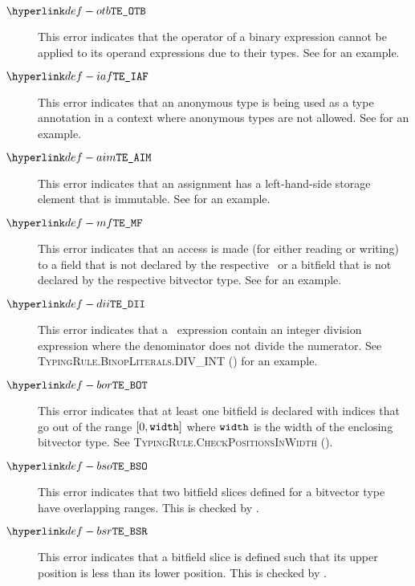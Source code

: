 \begin{description}
\hypertarget{def-otb}{}
\item[$\InvalidOperandTypesForBinop$]
This error indicates that the operator of a binary expression cannot be applied to its operand expressions
due to their types.
See  for an example.

\hypertarget{def-iaf}{}
\item[$\AnnonymousFormNotAllowedHere$]
This error indicates that an anonymous type is being used as a type annotation in a context
where anonymous types are not allowed.
See  for an example.

\hypertarget{def-aim}{}
\item[$\AssignmentToImmutable$]
This error indicates that an assignment has a left-hand-side storage element that is immutable.
See  for an example.

\hypertarget{def-mf}{}
\item[$\MissingField$]
This error indicates that an access is made (for either reading or writing) to a field that is
not declared by the respective \structuredtype\ or a bitfield that is not declared by the respective
bitvector type.
See  for an example.

\hypertarget{def-dii}{}
\item[$\DivIntIndivisible$]
This error indicates that a \staticallyevaluable\ expression contain an integer division expression where
the denominator does not divide the numerator.
See \textsc{TypingRule.BinopLiterals.DIV\_INT} () for an example.

\hypertarget{def-bot}{}
\item[$\BitfieldsOutOfRange$]
This error indicates that at least one bitfield is declared with indices that go out of the range
$[0, \texttt{width}]$ where $\texttt{width}$ is the width of the enclosing bitvector type.
See \textsc{TypingRule.CheckPositionsInWidth} ().

\hypertarget{def-bso}{}
\item[$\BitfieldSlicesOverlap$]
This error indicates that two bitfield slices defined for a bitvector type have overlapping ranges.
This is checked by .

\hypertarget{def-bsr}{}
\item[$\BitfieldSliceReversed$]
This error indicates that a bitfield slice is defined such that its upper position is less than its lower position.
This is checked by .


\end{description}

